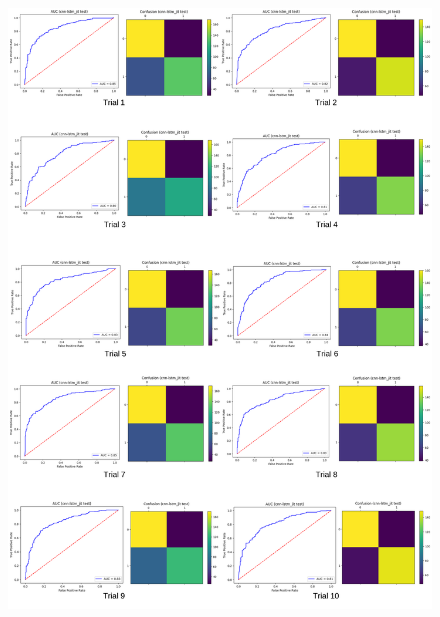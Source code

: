 \documentclass[format=sigconf, nonacm=true, review=false, screen=true]{acmart}
\begin{document}
\begin{figure}
    \centering
    \includegraphics[width=0.9\columnwidth]{figures/cnn-lstm_1.png}
    \label{fig:cnn-lstm_1}
\end{figure}
\end{document}
